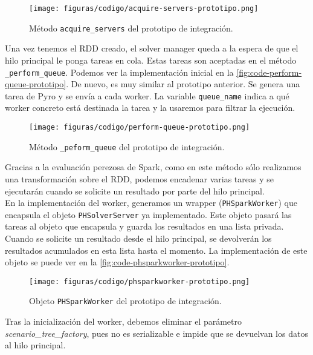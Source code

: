 \begin{figure}[]
    \centerline{\texttt{[image: figuras/codigo/acquire-servers-prototipo.png]}}
    \caption{Método \texttt{acquire\_servers} del prototipo de integración.}
    \label{fig:code-acquire-servers-prototipo}
\end{figure}

Una vez tenemos el RDD creado, el solver manager queda a la espera de que el hilo principal le ponga tareas en cola. Estas tareas son aceptadas en el método \texttt{\_perform\_queue}. Podemos ver la implementación inicial en la \autoref{fig:code-perform-queue-prototipo}. De nuevo, es muy similar al prototipo anterior. Se genera una tarea de Pyro y se envía a cada worker. La variable \texttt{queue\_name} indica a qué worker concreto está destinada la tarea y la usaremos para filtrar la ejecución. \\

\begin{figure}[]
    \centerline{\texttt{[image: figuras/codigo/perform-queue-prototipo.png]}}
    \caption{Método \texttt{\_peform\_queue} del prototipo de integración.}
    \label{fig:code-perform-queue-prototipo}
\end{figure}

Gracias a la evaluación perezosa de Spark, como en este método sólo realizamos una transformación sobre el RDD, podemos encadenar varias tareas y se ejecutarán cuando se solicite un resultado por parte del hilo principal.\\

En la implementación del worker, generamos un wrapper (\texttt{PHSparkWorker}) que encapsula el objeto \texttt{PHSolverServer} ya implementado. Este objeto pasará las tareas al objeto que encapsula y guarda los resultados en una lista privada. Cuando se solicite un resultado desde el hilo principal, se devolverán los resultados acumulados en esta lista hasta el momento. La implementación de este objeto se puede ver en la \autoref{fig:code-phsparkworker-prototipo}.\\

\begin{figure}[]
    \centerline{\texttt{[image: figuras/codigo/phsparkworker-prototipo.png]}}
    \caption{Objeto \texttt{PHSparkWorker} del prototipo de integración.}
    \label{fig:code-phsparkworker-prototipo}
\end{figure}

Tras la inicialización del worker, debemos eliminar el parámetro \textit{scenario\_tree\_factory}, pues no es serializable e impide que se devuelvan los datos al hilo principal.

